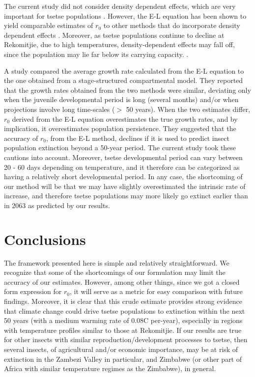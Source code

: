\documentclass[12pt,a4paper]{article}
\begin{document}
The current study did not consider density dependent effects, which are very important for tsetse populations \cite{Rogers1975}. However, the E-L equation has been shown to yield comparable estimates of $r_0$ to other methods that do incorporate density dependent effects \cite{Cortes2016}. Moreover, as tsetse populations continue to decline at Rekomitjie, due to high temperatures, density-dependent effects may fall off, since the population may lie far below its carrying capacity. . 


A study \cite{Amarasekare2013} compared the average growth rate calculated from the E-L equation to the one obtained from a stage-structured compartmental model. They reported that the growth rates obtained from the two methods were similar, deviating only when the juvenile developmental period is long (several months) and/or when projections involve long time-scales ($>$ 50 years).  When the two estimates differ, $r_0$ derived from the E-L equation overestimates the true growth rates, and by implication, it overestimates population persistence. They suggested that the accuracy of $r_0$, from the E-L method, declines if it is used to predict insect population extinction beyond a 50-year period.  The current study took these cautions into account. Moreover, tsetse developmental period can vary between 20 - 60 days depending on temperature, and it therefore can be categorized as having a relatively short developmental period. In any case, the shortcoming of our method will be that we may have slightly overestimated the intrinsic rate of increase, and therefore tsetse populations may more likely go extinct earlier than in 2063 as predicted by our results.

\section*{Conclusions}
The framework presented here is simple and relatively straightforward. We recognize that some of the shortcomings of our formulation may limit the accuracy of our estimates.  However, among other things, since we got a closed form expression for $r_0$, it will serve as a metric for easy comparison with future findings. Moreover, it is clear that this crude estimate provides strong evidence that climate change could drive tsetse populations to extinction within the next 50 years (with a medium warming rate of 0.08\textdegree C per-year), especially in regions with temperature profiles similar to those at Rekomitjie. If our results are true for other insects with similar reproduction/development processes to tsetse, then several insects, of agricultural and/or economic importance, may be at risk of extinction in the Zambezi Valley in particular, and Zimbabwe (or other part of Africa with similar temperature regimes as the Zimbabwe), in general. 
\end{document}
